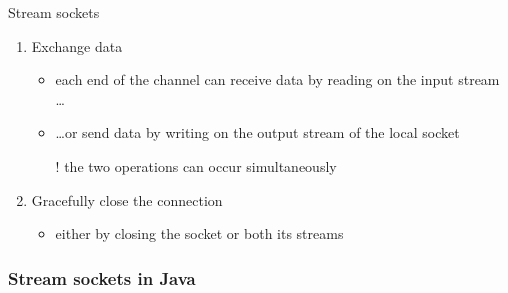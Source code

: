 \documentclass{beamer}\mode<presentation>{\usetheme{AMSBolognaFC}}
\begin{document}
\begin{frame}[c, allowframebreaks]{Stream sockets}
\begin{enumerate}
        \smallskip

        \item Exchange data
        \begin{itemize}
            \item each end of the channel can \alert{receive} data by \alert{reading} on the \alert{input stream} \ldots
            \item \ldots or send data by \alert{writing} on the output stream of the local socket
            \item[!] the two operations can occur simultaneously
        \end{itemize}

        \smallskip

        \item Gracefully close the connection
        \begin{itemize}
            \item either by closing the socket or both its streams
        \end{itemize}
    \end{enumerate}

\end{frame}

\subsubsection{Stream sockets in Java}
\end{document}
